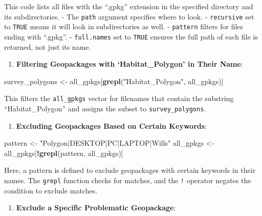 \documentclass[
]{book}
\newenvironment{Shaded}{\begin{snugshade}}{\end{snugshade}}
\newcommand{\FunctionTok}[1]{\textcolor[rgb]{0.13,0.29,0.53}{\textbf{#1}}}
\newcommand{\NormalTok}[1]{#1}
\newcommand{\OtherTok}[1]{\textcolor[rgb]{0.56,0.35,0.01}{#1}}
\newcommand{\SpecialCharTok}[1]{\textcolor[rgb]{0.81,0.36,0.00}{\textbf{#1}}}
\newcommand{\StringTok}[1]{\textcolor[rgb]{0.31,0.60,0.02}{#1}}
\providecommand{\tightlist}{%
  \setlength{\itemsep}{0pt}\setlength{\parskip}{0pt}}
\begin{document}
This code lists all files with the ``.gpkg'' extension in the specified directory and its subdirectories.
- The \texttt{path} argument specifies where to look.
- \texttt{recursive} set to \texttt{TRUE} means it will look in subdirectories as well.
- \texttt{pattern} filters for files ending with ``.gpkg''.
- \texttt{full.names} set to \texttt{TRUE} ensures the full path of each file is returned, not just its name.

\begin{enumerate}
\def\labelenumi{\arabic{enumi}.}
\setcounter{enumi}{2}
\tightlist
\item
  \textbf{Filtering Geopackages with `Habitat\_Polygon' in Their Name}:
\end{enumerate}

\begin{Shaded}
\begin{Highlighting}[]
\NormalTok{   survey\_polygons }\OtherTok{\textless{}{-}}\NormalTok{ all\_gpkgs[}\FunctionTok{grepl}\NormalTok{(}\StringTok{"Habitat\_Polygon"}\NormalTok{, all\_gpkgs)]}
\end{Highlighting}
\end{Shaded}

This filters the \texttt{all\_gpkgs} vector for filenames that contain the substring ``Habitat\_Polygon'' and assigns the subset to \texttt{survey\_polygons}.

\begin{enumerate}
\def\labelenumi{\arabic{enumi}.}
\setcounter{enumi}{3}
\tightlist
\item
  \textbf{Excluding Geopackages Based on Certain Keywords}:
\end{enumerate}

\begin{Shaded}
\begin{Highlighting}[]
\NormalTok{   pattern }\OtherTok{\textless{}{-}} \StringTok{"Polygon|DESKTOP|PC|LAPTOP|Wills"}
\NormalTok{   all\_gpkgs }\OtherTok{\textless{}{-}}\NormalTok{ all\_gpkgs[}\SpecialCharTok{!}\FunctionTok{grepl}\NormalTok{(pattern, all\_gpkgs)]}
\end{Highlighting}
\end{Shaded}

Here, a pattern is defined to exclude geopackages with certain keywords in their names. The \texttt{grepl} function checks for matches, and the \texttt{!} operator negates the condition to exclude matches.

\begin{enumerate}
\def\labelenumi{\arabic{enumi}.}
\setcounter{enumi}{4}
\tightlist
\item
  \textbf{Exclude a Specific Problematic Geopackage}:
\end{enumerate}
\end{document}
